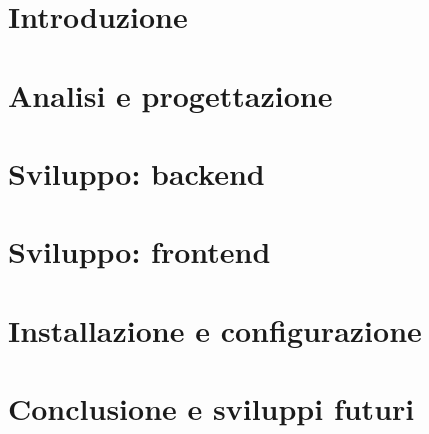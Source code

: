 \documentclass{report}
\begin{document}
    
    \tableofcontents
    \chapter{Introduzione}
    \chapter{Analisi e progettazione}
    \chapter{Sviluppo: backend}
    \chapter{Sviluppo: frontend}
    \chapter{Installazione e configurazione}
    \chapter{Conclusione e sviluppi futuri}
\end{document}
